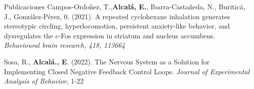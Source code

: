 \documentclass{resume} %
\begin{document}
\begin{rSection}{Publicaciones}
	Campos-Ordoñez, T.,\textbf{Alcalá, E.}, Ibarra-Castañeda, N., Buriticá, J., González-Pérez, 0. (2021). A repeated cyclohexane inhalation generates stereotypic circling, hyperlocomotion, persistent anxiety-like behavior, and dysregulates the c-Fos expression in striatum and nucleus accumbens. \textit{Behavioural brain research, 418, 113664}
	
	Sosa, R., \textbf{Alcalá., E}. (2022). The Nervous System as a Solution for Implementing Closed Negative Feedback Control Loops. \textit{Journal of Experimental Analysis of Behavior}, 1-22
	
	
	\end{rSection}
\end{document}
